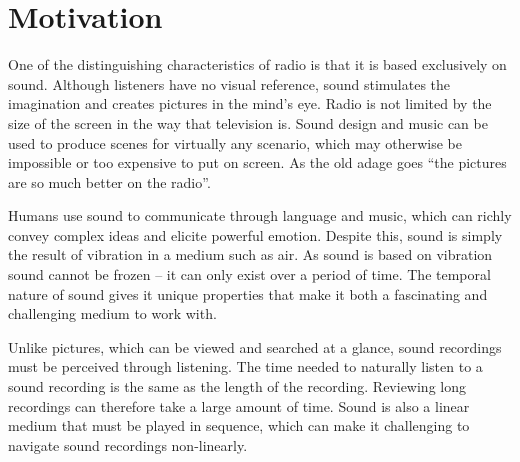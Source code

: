
\section{Motivation}\label{sec:intro-motivation}



One of the distinguishing characteristics of radio is that it is based exclusively on sound.  Although listeners have
no visual reference, sound stimulates the imagination and creates pictures in the mind's eye.  Radio is not limited
by the size of the screen in the way that television is. Sound design and music can be used to produce scenes for
virtually any scenario, which may otherwise be impossible or too expensive to put on screen. As the old adage goes
``the pictures are so much better on the radio''.

Humans use sound to communicate through language and music, which can richly convey complex ideas and elicite powerful
emotion. Despite this, sound is simply the result of vibration in a medium such as air.  As sound is based on vibration
sound cannot be frozen -- it can only exist over a period of time. The temporal nature of sound gives it unique
properties that make it both a fascinating and challenging medium to work with.

Unlike pictures, which can be viewed and searched at a glance, sound recordings must be perceived through listening.
The time needed to naturally listen to a sound recording is the same as the length of the recording.  Reviewing long
recordings can therefore take a large amount of time. Sound is also a linear medium that must be played in sequence,
which can make it challenging to navigate sound recordings non-linearly. 

